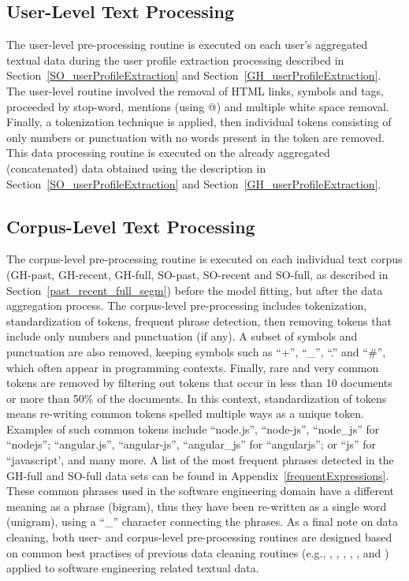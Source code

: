     \subsection{User-Level Text Processing}
    
        The user-level pre-processing routine is executed on each user's aggregated textual data during the user profile extraction processing described in Section~\ref{SO_userProfileExtraction} and Section~\ref{GH_userProfileExtraction}. The user-level routine involved the removal of HTML links, symbols and tags, proceeded by stop-word, mentions (using @) and multiple white space removal. Finally, a tokenization technique is applied, then individual tokens consisting of only numbers or punctuation with no words present in the token are removed. This data processing routine is executed on the already aggregated (concatenated) data obtained using the description in Section~\ref{SO_userProfileExtraction} and Section~\ref{GH_userProfileExtraction}.
        
    \subsection{Corpus-Level Text Processing\label{CorpusLevel_preprocessing}}
    
        The corpus-level pre-processing routine is executed on each individual text corpus (GH-past, GH-recent, GH-full, SO-past, SO-recent and SO-full, as described in Section~\ref{past_recent_full_segm}) before the model fitting, but after the data aggregation process. The corpus-level pre-processing includes tokenization, standardization of tokens, frequent phrase detection, then removing tokens that include only numbers and punctuation (if any). A subset of symbols and punctuation are also removed, keeping symbols such as ``+'', ``\_'', ``.'' and ``\#'', which often appear in programming contexts. Finally, rare and very common tokens are removed by filtering out tokens that occur in less than 10 documents or more than 50\% of the documents. In this context, standardization of tokens means re-writing common tokens spelled multiple ways as a unique token. Examples of such common tokens include ``node.js'', ``node-js'', ``node\_js'' for ``nodejs''; ``angular.js'', ``angular-js'', ``angular\_js'' for ``angularjs''; or ``js'' for ``javascript', and many more. A list of the most frequent phrases detected in the GH-full and SO-full data sets can be found in Appendix~\ref{frequentExpressions}. These common phrases used in the software engineering domain have a different meaning as a phrase (bigram), thus they have been re-written as a single word (unigram), using a ``\_'' character connecting the phrases. As a final note on data cleaning, both user- and corpus-level pre-processing routines are designed based on common best practises of previous data cleaning routines (e.g., \cite{tian2013predicting}, \cite{campbell2015latent}, \cite{treude2019predicting}, \cite{efstathiou2018word}, \cite{boyd2014care}, and \cite{liao2019status}) applied to software engineering related textual data.

